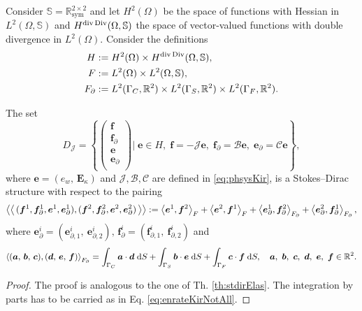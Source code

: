 \begin{theorem}\label{th:stdirKir}
	Consider $\mathbb{S} = \mathbb{R}^{2\times 2}_{\text{sym}}$ and
	let $H^{2}(\Omega)$ be the space of functions with Hessian in $L^2(\Omega, \mathbb{S})$ and $H^{\div\Div}  (\Omega, \mathbb{S})$ the space of vector-valued functions with double divergence in $L^2(\Omega)$. Consider the definitions
	\begin{align*}
	H &:=H^{2}(\Omega) \times H^{\div\Div}(\Omega, \mathbb{S}), \\
	F &:= L^2(\Omega) \times L^2(\Omega, \mathbb{S}), \\
	F_\partial &:= L^2(\Gamma_C, \mathbb{R}^2) \times L^2(\Gamma_S, \mathbb{R}^2) \times L^2(\Gamma_F, \mathbb{R}^2). 
	\end{align*}
	
	The set 
	\begin{equation}
	{D}_{\mathcal{J}} = \left\{
	\begin{pmatrix}
	\bm{f} \\ \bm{f}_\partial \\ \bm{e} \\ \bm{e}_\partial \\
	\end{pmatrix}
	\vert \;
	\bm{e} \in H, \; \bm{f} = -\mathcal{J} \bm{e}, \;\bm{f}_\partial = \mathcal{B}\bm{e}, \; \bm{e}_\partial = \mathcal{C}\bm{e}   \right\},
	\end{equation}
	where $\bm{e} = ({e}_w, \, \bm{E}_\kappa)$ and $\mathcal{J, B, C}$ are defined in \eqref{eq:phsysKir}, is a Stokes–Dirac structure with respect to the pairing
	\begin{equation}\label{eq:bilinearKir}
	\bilprod{(\bm{f}^1, \bm{f}_{\partial}^1, \bm{e}^1, \bm{e}_{\partial}^1)}{(\bm{f}^2, \bm{f}_{\partial}^2, \bm{e}^2, \bm{e}_{\partial}^2)}  := \inner[F]{\bm{e}^1}{\bm{f}^2} + \inner[F]{\bm{e}^2}{\bm{f}^1} + \inner[F_\partial]{\bm{e}_{\partial}^1}{\bm{f}_{\partial}^2} + \inner[F_\partial]{\bm{e}_{\partial}^2}{\bm{f}_{\partial}^1},
	\end{equation}
	where $\bm{e}_{\partial}^i = (\bm{e}_{\partial, 1}^i, \ \bm{e}_{\partial, 2}^i), \, \bm{f}_{\partial}^i = (\bm{f}_{\partial, 1}^i, \ \bm{f}_{\partial, 2}^i)$ and
	\begin{equation*}
	\inner[F_\partial]{(\bm{a}, \, \bm{b}, \, \bm{c})}{(\bm{d}, \, \bm{e}, \, \bm{f})} = \int_{\Gamma_C} \bm{a} \cdot \bm{d} \d{S} + \int_{\Gamma_S} \bm{b} \cdot \bm{e} \d{S}  + \int_{\Gamma_F} \bm{c} \cdot \bm{f} \d{S}, \quad \bm{a},\ \bm{b},\ \bm{c},\ \bm{d},\ \bm{e},\ \bm{f} \in \mathbb{R}^2. 
	\end{equation*}
	
	\begin{proof}
		The proof is analogous to the one of Th. \ref{th:stdirElas}. The integration by parts has to be carried as in Eq. \eqref{eq:enrateKirNotAll}.
	\end{proof}

\end{theorem}

